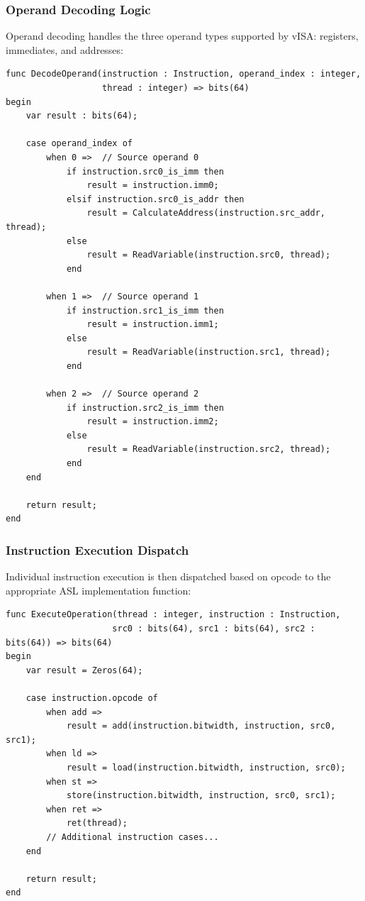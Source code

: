 \subsubsection{Operand Decoding Logic}
Operand decoding handles the three operand types supported by vISA: registers,
immediates, and addresses:

\begin{lstlisting}[caption={Per-Thread Operand Decoding}, label={lst:operand_decoding}]
func DecodeOperand(instruction : Instruction, operand_index : integer, 
                   thread : integer) => bits(64)
begin
    var result : bits(64);
    
    case operand_index of
        when 0 =>  // Source operand 0
            if instruction.src0_is_imm then
                result = instruction.imm0;
            elsif instruction.src0_is_addr then
                result = CalculateAddress(instruction.src_addr, thread);
            else
                result = ReadVariable(instruction.src0, thread);
            end
            
        when 1 =>  // Source operand 1
            if instruction.src1_is_imm then
                result = instruction.imm1;
            else
                result = ReadVariable(instruction.src1, thread);
            end
            
        when 2 =>  // Source operand 2
            if instruction.src2_is_imm then
                result = instruction.imm2;
            else
                result = ReadVariable(instruction.src2, thread);
            end
    end
    
    return result;
end
\end{lstlisting}



\subsubsection{Instruction Execution Dispatch}
Individual instruction execution is then dispatched based on opcode to the
appropriate ASL implementation function:

\begin{lstlisting}[caption={Instruction Execution Dispatch}, label={lst:execution_dispatch}]
func ExecuteOperation(thread : integer, instruction : Instruction, 
                     src0 : bits(64), src1 : bits(64), src2 : bits(64)) => bits(64)
begin
    var result = Zeros(64);
    
    case instruction.opcode of
        when add => 
            result = add(instruction.bitwidth, instruction, src0, src1);
        when ld => 
            result = load(instruction.bitwidth, instruction, src0);
        when st => 
            store(instruction.bitwidth, instruction, src0, src1);
        when ret => 
            ret(thread);
        // Additional instruction cases...
    end
    
    return result;
end
\end{lstlisting}

